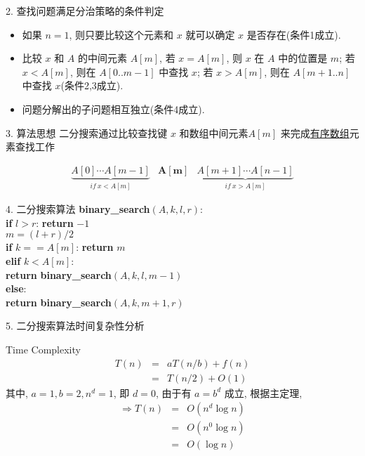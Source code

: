 \documentclass[fontset=fandol,UTF8,fleqn]{beamer}
\begin{document}
\begin{frame}{2. 查找问题满足分治策略的条件判定}
\begin{itemize}[<+-|alert@+>]
\item[(1)] 如果 $n=1$, 则只要比较这个元素和 $x$ 就可以确定 $x$ 是否存在(条件1成立).
\item[(2)] 比较 $x$ 和 $A$ 的中间元素 $A[m]$, 若 $x=A[m]$, 则 $x$ 在 $A$ 中的位置是 $m$; 若 $x<A[m]$, 则在 $A[0..m-1]$ 中查找 $x$; 若 $x>A[m]$, 则在 $A[m+1..n]$ 中查找 $x$(条件2,3成立).
\item[(3)] 问题分解出的子问题相互独立(条件4成立).
\end{itemize}
\end{frame}

\begin{frame}{3. 算法思想} 
二分搜索通过比较查找键 $x$ 和数组中间元素$A[m]$ 来完成\underline{有序数组}元素查找工作 
\begin{exampleblock}{}
  \begin{eqnarray*}
\underbrace{A[0]\cdots A[m-1]}_{ if\ x<A[m]} & \boldsymbol{A[m]} & \underbrace{A[m+1]\cdots A[n-1]}_{if\ x>A[m]}  
\end{eqnarray*}
\end{exampleblock}
\end{frame}

\begin{frame}{4. 二分搜索算法}
\textbf{binary\_search}$(A, k, l, r)$:\\
\qquad    \textbf{if} $l > r$: \textbf{return} $-1$\\
\qquad    $m = (l+r)/2$\\
\qquad      \textbf{if} $k == A[m]$: \textbf{return} $m$ \\
\qquad      \textbf{elif} $k < A[m]$: \\
\qquad \qquad \textbf{return} \textbf{binary\_search}$(A, k, l, m-1)$ \\
\qquad     \textbf{else}: \\
\qquad \textbf{return} \textbf{binary\_search}$(A, k, m+1, r)$
\end{frame}

\begin{frame}{5. 二分搜索算法时间复杂性分析}
  \begin{exampleblock}{Time Complexity}
    \begin{eqnarray*}
  T(n) & = & aT(n/b)+f(n) \\
   & = & T(n/2)+O(1)  
 \end{eqnarray*}
其中, $a = 1, b=2, n^d=1$, 即 $d = 0$, 由于有 $a  = b^d$ 成立, 根据主定理, 
\begin{eqnarray*}
   \Rightarrow    T(n) & = &   O(n^d \log n)  \\
                       & = & O(n^0 {\log n}) \\    
                       &  = & O(\log n) 
\end{eqnarray*}
\end{exampleblock}
\end{frame}
\end{document}
